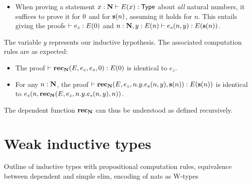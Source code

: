 \begin{itemize}
\item When proving a statement $x : \mathbf{N} \vdash E(x) : \mathsf{Type}$ about \emph{all} natural numbers, it suffices to prove it for $0$ and for $\mathbf{s}(n)$, assuming it holds
for $n$. This entails giving the proofs $\vdash e_z : E(0)$ and $n : \mathbf{N}, y : E(n) \vdash e_s(n,y) : E(\mathbf{s}(n))$.
\end{itemize}
The variable $y$ represents our inductive hypothesis. The associated computation rules are as expected:
\begin{itemize}
\item The proof $\vdash \mathbf{rec}_\mathbf{N}(E,e_z,e_s,0) : E(0)$ is identical to $e_z$.
\item For any $n : \mathbf{N}$, the proof $\vdash \mathbf{rec}_\mathbf{N}(E,e_z,n.y.e_s(n,y),\mathbf{s}(n)) : E(\mathbf{s}(n))$ is identical to $e_s(n,\mathbf{rec}_\mathbf{N}(E,e_z,n.y.e_s(n,y),n))$.
\end{itemize}
The dependent function $\mathbf{rec}_\mathbf{N}$ can thus be understood as defined recursively.


\section{Weak inductive types}
Outline of inductive types with propositional computation rules, equivalence between dependent and simple elim, encoding of nats as W-types